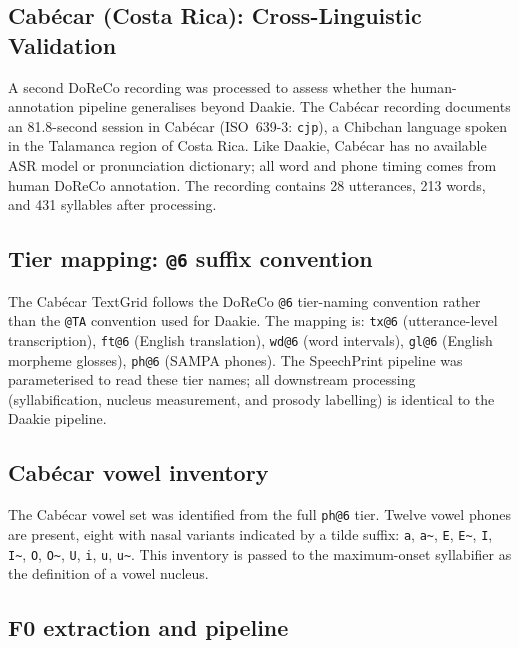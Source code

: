 \subsection{Cabécar (Costa Rica): Cross-Linguistic Validation}
\label{sec:cabeca_pipeline}

A second DoReCo recording was processed to assess whether the human-annotation
pipeline generalises beyond Daakie. The Cabécar recording \cite{quesada2024cabeca}
documents an 81.8-second session in Cabécar (ISO~639-3: \texttt{cjp}), a Chibchan
language spoken in the Talamanca region of Costa Rica. Like Daakie, Cabécar has no
available ASR model or pronunciation dictionary; all word and phone timing
comes from human DoReCo annotation. The recording contains 28 utterances,
213 words, and 431 syllables after processing.

\subsection{Tier mapping: \texttt{@6} suffix convention}

The Cabécar TextGrid follows the DoReCo \texttt{@6} tier-naming convention
rather than the \texttt{@TA} convention used for Daakie. The mapping is:
\texttt{tx@6} (utterance-level transcription), \texttt{ft@6} (English
translation), \texttt{wd@6} (word intervals), \texttt{gl@6} (English morpheme
glosses), \texttt{ph@6} (SAMPA phones). The SpeechPrint pipeline was
parameterised to read these tier names; all downstream processing
(syllabification, nucleus measurement, and prosody labelling) is
identical to the Daakie pipeline.

\subsection{Cabécar vowel inventory}

The Cabécar vowel set was identified from the full \texttt{ph@6} tier. Twelve
vowel phones are present, eight with nasal variants indicated by a tilde suffix:
\texttt{a}, \texttt{a\~{}}, \texttt{E}, \texttt{E\~{}}, \texttt{I},
\texttt{I\~{}}, \texttt{O}, \texttt{O\~{}}, \texttt{U}, \texttt{i},
\texttt{u}, \texttt{u\~{}}. This inventory is passed to the maximum-onset
syllabifier as the definition of a vowel nucleus.

\subsection{F0 extraction and pipeline}


